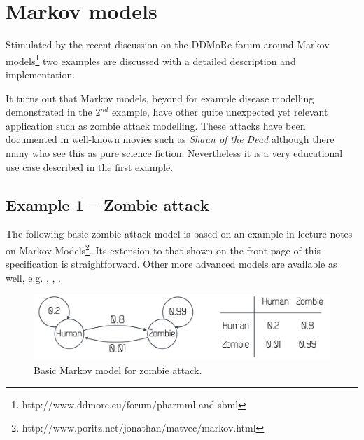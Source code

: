 %


\section{Markov models}
\label{sec:markovModels}
Stimulated by the recent discussion on the DDMoRe forum around Markov 
models\footnote{http://www.ddmore.eu/forum/pharmml-and-sbml}
two examples are discussed with a detailed description and implementation.

It turns out that Markov models, beyond for example disease modelling demonstrated 
in the 2$^{nd}$ example, have other quite unexpected yet relevant application such as zombie 
attack modelling. These attacks have been documented in well-known movies 
such as \emph{Shaun of the Dead} although there many who see this as pure science
fiction. Nevertheless it is a very educational use case described in the first example.

\subsection{Example 1 -- Zombie attack}
\label{subsec:exp1}
The following basic zombie attack model is based on an example in lecture 
notes on Markov Models\footnote{http://www.poritz.net/jonathan/matvec/markov.html}.
Its extension to that shown on the front page of this specification is straightforward.
Other more advanced models are available as well, e.g. \cite{munz2009zombies}, 
\cite{witkowski2013bayesian}, \cite{woolley2014long}.

\begin{figure}[ht!]
\centering
  \includegraphics[width=120mm]{pics/MarkovZombie.pdf}
 \caption{Basic Markov model for zombie attack.}
 \label{fig:MarkovZombie}
\end{figure}


